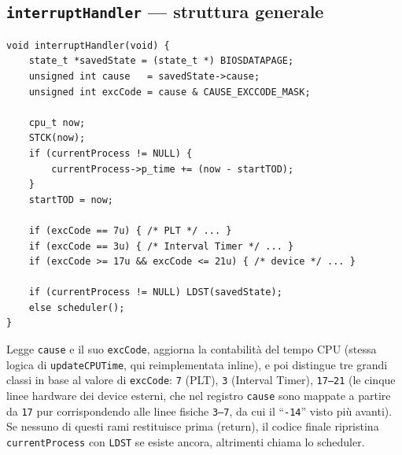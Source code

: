 \documentclass[11pt,a4paper]{article}
\newcommand{\code}[1]{\texttt{#1}}
\newcommand{\func}[1]{\textbf{\texttt{#1}}}
\begin{document}
\subsection{\func{interruptHandler} --- struttura generale}
\begin{lstlisting}
void interruptHandler(void) {
    state_t *savedState = (state_t *) BIOSDATAPAGE;
    unsigned int cause   = savedState->cause;
    unsigned int excCode = cause & CAUSE_EXCCODE_MASK;

    cpu_t now;
    STCK(now);
    if (currentProcess != NULL) {
        currentProcess->p_time += (now - startTOD);
    }
    startTOD = now;

    if (excCode == 7u) { /* PLT */ ... }
    if (excCode == 3u) { /* Interval Timer */ ... }
    if (excCode >= 17u && excCode <= 21u) { /* device */ ... }

    if (currentProcess != NULL) LDST(savedState);
    else scheduler();
}
\end{lstlisting}
Legge \code{cause} e il suo \code{excCode}, aggiorna la contabilità del
tempo CPU (stessa logica di \code{updateCPUTime}, qui reimplementata
inline), e poi distingue tre grandi classi in base al valore di
\code{excCode}: \code{7} (PLT), \code{3} (Interval Timer),
\code{17--21} (le cinque linee hardware dei device esterni, che nel
registro \code{cause} sono mappate a partire da \code{17} pur
corrispondendo alle linee fisiche \code{3--7}, da cui il ``\code{-14}''
visto più avanti). Se nessuno di questi rami restituisce prima (return),
il codice finale ripristina \code{currentProcess} con \code{LDST} se
esiste ancora, altrimenti chiama lo scheduler.
\end{document}
